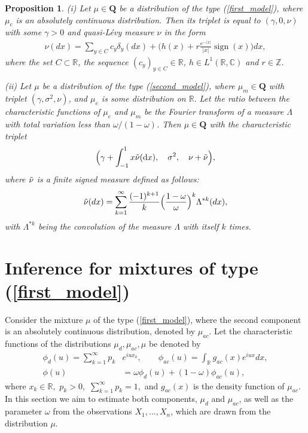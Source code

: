 \documentclass[numbers,webpdf,imaiai]{ima-authoring-template}%
\theoremstyle{thmstyletwo}%
\newtheorem{proposition}{Proposition}%
\newcommand{\Z}{\mathbb{Z}}
\newcommand{\R}{\mathbb{R}}
\newcommand{\C}{\mathbb{C}}
\newcommand{\B}{\mathcal{B}}
\newcommand{\Q}{\pmb{Q}}
\newcommand{\w}{\omega}
\newcommand{\sign}{\operatorname{sign}}
\numberwithin{equation}{section}
\begin{document}
\begin{proposition} \label{propmain}
(i)  Let $\mu\in \Q$ be a distribution of the type (\ref{first_model}), where $\mu_c$ is an absolutely continuous distribution. Then its triplet is equal to \((\gamma,0, \nu)\) with some \(\gamma>0\) and  quasi-L{\'e}vy measure \(\nu\) in the form 
\begin{eqnarray}\label{nu1}
\nu(dx) =  \sum_{y \in C} c_y \delta_y (dx)+ \bigl( 
h(x) + r \frac{e^{-|x|}}{|x|}\sign(x) 
\bigr) dx,
\end{eqnarray}
where the set $C \subset \R$, the sequence $(c_y)_{y \in C} \in \R$, $h \in L^1(\R, \C)$ and $r \in \Z$.

(ii) Let $\mu$ be a distribution  of the type (\ref{second_model}), where $\mu_m \in \Q$  with  triplet $(\gamma, \sigma^2, \nu)$, and $\mu_e$ is some distribution on \(\R.\) Let 
the ratio between the characteristic functions of \(\mu_e\) and \(\mu_m\) be the Fourier transform of a measure \(\Lambda\) with total variation less than \(\w/(1-\w)\). Then $\mu \in \Q$ with the characteristic triplet \[\Bigl(\gamma + \int_{-1}^1 x \Tilde{\nu}(\mathrm{d}x),  \quad \sigma^2, \quad  \nu + \Tilde{\nu}\Bigr),\]
where $\Tilde{\nu}$ is a finite signed measure defined as follows: \begin{equation}\label{Tildenu}
    \Tilde{\nu}(dx) = \sum_{k = 1}^{\infty} \frac{(-1)^{k + 1}}{k}\Bigl( 
\frac{1-\w}{\w} 
\Bigr)^k\Lambda^{*k}(dx),%
\end{equation}
with $\Lambda^{*k}$ being the convolution of the measure $\Lambda$ with itself  $k$ times.
\end{proposition}

\section{Inference for mixtures of type (\ref{first_model})}\label{sec_stat_approach}
Consider the mixture $\mu$ of the type (\ref{first_model}), where the second component is an absolutely continuous distribution, denoted by $\mu_{ac}$. Let the characteristic functions of the distributions \(\mu_d, \mu_{ac}, \mu\) be denoted by 
\begin{align} \label{phiw}
\phi_d (u) = \sum_{k = 1}^{\infty} p_k &e^{iux_k}, \qquad 
\phi_{ac} (u) = \int_{\R} g_{ac}(x) e^{iux} dx, \nonumber \\
\phi(u) &= \w \phi_d(u) + (1 - \w) \phi_{ac}(u),
\end{align}
where \(x_k \in \R,\) \(p_k >0,\) \(\sum_{k=1}^\infty p_k =1,\)  and  $g_{ac}(x)$ is the density function of $\mu_{ac}$.  In this section we aim to estimate both components, \(\mu_d\) and \(\mu_{ac}\), as well as  the parameter \(\w\) from the observations \(X_1,..., X_n\), which are drawn from the distribution \(\mu.\) 
\end{document}
